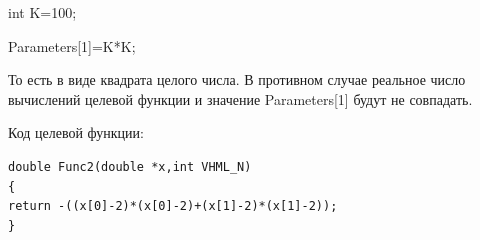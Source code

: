 int K=100;

Parameters[1]=K*K;

То есть в виде квадрата целого числа. В противном случае реальное число вычислений целевой функции и значение Parameters[1] будут не совпадать.

Код целевой функции:
\begin{lstlisting}[caption=Оптимизируемая функция]
double Func2(double *x,int VHML_N)
{
return -((x[0]-2)*(x[0]-2)+(x[1]-2)*(x[1]-2));
}
\end{lstlisting}